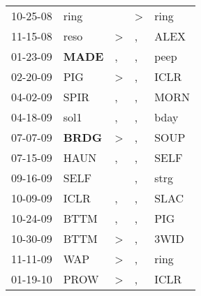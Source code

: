 \begin{supertabular}{p{0.07\textwidth}p{0.06\textwidth}p{0.02\textwidth}p{0.02\textwidth}p{0.06\textwidth}}
          10-25-08\textsuperscript{} &           ring\textsuperscript{} &                  &     \textgreater &           ring\textsuperscript{} \\
          11-15-08\textsuperscript{} &           reso\textsuperscript{} &     \textgreater &                , &           ALEX\textsuperscript{} \\
          01-23-09\textsuperscript{} &  \textbf{MADE\textsuperscript{}} &                , &                , &           peep\textsuperscript{} \\
          02-20-09\textsuperscript{} &            PIG\textsuperscript{} &     \textgreater &                , &           ICLR\textsuperscript{} \\
          04-02-09\textsuperscript{} &           SPIR\textsuperscript{} &                , &                , &           MORN\textsuperscript{} \\
          04-18-09\textsuperscript{} &           sol1\textsuperscript{} &                , &                , &           bday\textsuperscript{} \\
          07-07-09\textsuperscript{} &  \textbf{BRDG\textsuperscript{}} &     \textgreater &                , &           SOUP\textsuperscript{} \\
          07-15-09\textsuperscript{} &           HAUN\textsuperscript{} &                , &                , &           SELF\textsuperscript{} \\
          09-16-09\textsuperscript{} &           SELF\textsuperscript{} &                  &                , &           strg\textsuperscript{} \\
          10-09-09\textsuperscript{} &           ICLR\textsuperscript{} &                , &                , &           SLAC\textsuperscript{} \\
          10-24-09\textsuperscript{} &           BTTM\textsuperscript{} &                , &                , &            PIG\textsuperscript{} \\
          10-30-09\textsuperscript{} &           BTTM\textsuperscript{} &     \textgreater &                , &           3WID\textsuperscript{} \\
          11-11-09\textsuperscript{} &            WAP\textsuperscript{} &     \textgreater &                , &           ring\textsuperscript{} \\
          01-19-10\textsuperscript{} &           PROW\textsuperscript{} &     \textgreater &                , &           ICLR\textsuperscript{} \\

\end{supertabular}
